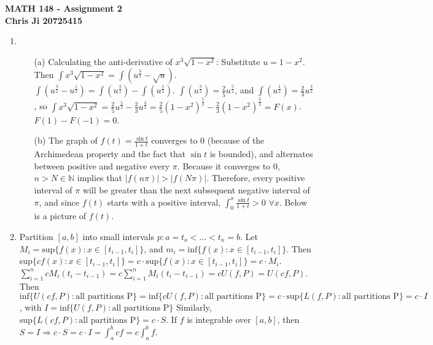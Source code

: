 \documentclass[10pt,english]{article}
\begin{document}
\noindent \begin{center}
\textbf{\large{}MATH 148 - Assignment 2}\\
\textbf{\large{}Chris Ji 20725415}
\par\end{center}{\large \par}
\medskip{}

\begin{enumerate}
\item \begin{enumerate}
    \item [(a)] Calculating the anti-derivative of $x^{3}\sqrt{1-x^{2}}$: Substitute $u=1-x^2$. Then $\int x^3\sqrt{1-x^2}=\int(u^\frac{3}{2}-\sqrt{u})$. $\int (u^\frac{3}{2}-u^\frac{1}{2})=\int(u^\frac{3}{2})-\int(u^\frac{1}{2})$. $\int(u^\frac{3}{2})=\frac{2}{5}u^\frac{5}{2}$, and $\int(u^\frac{1}{2})=\frac{2}{3}u^\frac{3}{2}$, so $\int x^3\sqrt{1-x^2}=\frac{2}{5}u^\frac{5}{2}-\frac{2}{3}u^\frac{3}{2}=\frac{2}{5}(1-x^2)^\frac{5}{2}-\frac{2}{3}(1-x^2)^\frac{3}{2}=F(x)$. $F(1)-F(-1)=0$.
    \item [(b)] The graph of $f(t)=\frac{\sin t}{1+t}$ converges to 0 (because of the Archimedean property and the fact that $\sin t$ is bounded), and alternates between positive and negative every $\pi$. Because it converges to 0, $n>N\in\mathbb{N}$ implies that $|f(n\pi)|>|f(N\pi)|$. Therefore, every positive interval of $\pi$ will be greater than the next subsequent negative interval of $\pi$, and since $f(t)$ starts with a positive interval, $\int_0^x\frac{\sin t}{1+t}>0$ $\forall x$. 
    Below is a picture of $f(t)$. 
\end{enumerate}

\item Partition $[a,b]$ into small intervals $p: a = t_o < \ldots < t_n = b$. Let $M_i = \text{sup}\{f(x):x\in[t_{i-1},t_i]\}$, and $m_i = \text{inf}\{f(x):x\in[t_{i-1},t_i]\}$. Then sup$\{cf(x):x\in[t_{i-1},t_i]\}= c\cdot\text{sup}\{f(x):x\in[t_{i-1},t_i]\}= c\cdot M_i$. $\sum_{i=1}^ncM_i(t_i-t_{i-1})=c\sum_{i=1}^nM_i(t_i-t_{i-1})=cU(f,P)=U(cf,P)$. Then $\text{inf}\{U(cf,P):\text{all partitions P}\}=\text{inf}\{cU(f,P):\text{all partitions P}\}=c\cdot\text{sup}\{L(f,P):\text{all partitions P}\}=c\cdot I$, with $I=\text{inf}\{U(f,P):\text{all partitions P}\}$ Similarly, $\text{sup}\{L(cf,P):\text{all partitions P}\}=c\cdot S$. If $f$ is integrable over $[a,b]$, then $S=I\Rightarrow c\cdot S=c\cdot I=\int_a^bcf=c\int_a^bf$. 



\end{enumerate}
\end{document}
